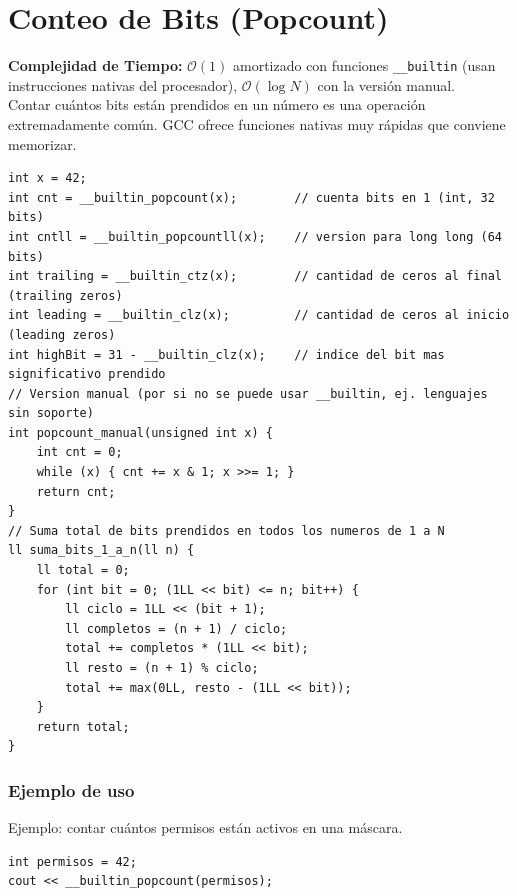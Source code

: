 \documentclass[10pt,twocolumn,letterpaper]{report}
\begin{document}
\section{Conteo de Bits (Popcount)}
\textbf{Complejidad de Tiempo:} $\mathcal{O}(1)$ amortizado con funciones \texttt{\_\_builtin} (usan instrucciones nativas del procesador), $\mathcal{O}(\log N)$ con la versión manual. \\
Contar cuántos bits están prendidos en un número es una operación extremadamente común. GCC ofrece funciones nativas muy rápidas que conviene memorizar.
\begin{lstlisting}
int x = 42;
int cnt = __builtin_popcount(x);        // cuenta bits en 1 (int, 32 bits)
int cntll = __builtin_popcountll(x);    // version para long long (64 bits)
int trailing = __builtin_ctz(x);        // cantidad de ceros al final (trailing zeros)
int leading = __builtin_clz(x);         // cantidad de ceros al inicio (leading zeros)
int highBit = 31 - __builtin_clz(x);    // indice del bit mas significativo prendido
// Version manual (por si no se puede usar __builtin, ej. lenguajes sin soporte)
int popcount_manual(unsigned int x) {
    int cnt = 0;
    while (x) { cnt += x & 1; x >>= 1; }
    return cnt;
}
// Suma total de bits prendidos en todos los numeros de 1 a N
ll suma_bits_1_a_n(ll n) {
    ll total = 0;
    for (int bit = 0; (1LL << bit) <= n; bit++) {
        ll ciclo = 1LL << (bit + 1);
        ll completos = (n + 1) / ciclo;
        total += completos * (1LL << bit);
        ll resto = (n + 1) % ciclo;
        total += max(0LL, resto - (1LL << bit));
    }
    return total;
}
\end{lstlisting}
\subsubsection*{Ejemplo de uso}
Ejemplo: contar cuántos permisos están activos en una máscara.
\begin{lstlisting}
int permisos = 42;
cout << __builtin_popcount(permisos);
\end{lstlisting}
\end{document}
